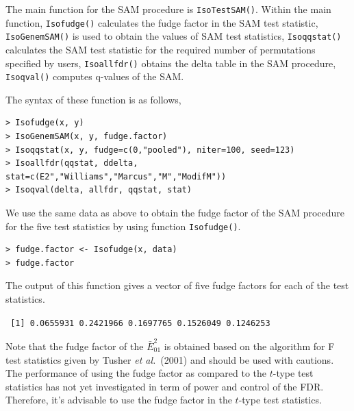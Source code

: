 The main function for the SAM procedure is \texttt{IsoTestSAM()}. Within the main function, \texttt{Isofudge()}
calculates the fudge factor in the SAM test statistic, \texttt{IsoGenemSAM()} is used
to obtain the values of SAM test statistics, \texttt{Isoqqstat()} calculates the SAM test statistic 
for the required number of permutations specified by users, \texttt{Isoallfdr()} obtains the delta table in the SAM procedure,
\texttt{Isoqval()} computes q-values of the SAM.  %

The syntax of these function is as follows,
\begin{center}
\begin{boxit}
\begin{verbatim}
> Isofudge(x, y)
> IsoGenemSAM(x, y, fudge.factor)
> Isoqqstat(x, y, fudge=c(0,"pooled"), niter=100, seed=123)
> Isoallfdr(qqstat, ddelta, stat=c(E2","Williams","Marcus","M","ModifM"))
> Isoqval(delta, allfdr, qqstat, stat)
\end{verbatim}
\end{boxit}
\end{center}


We use the same data as above to obtain the fudge factor of the SAM procedure for 
the five test statistics by using function \texttt{Isofudge()}.
\begin{center}
\begin{boxit}
\begin{verbatim}
> fudge.factor <- Isofudge(x, data)
> fudge.factor
\end{verbatim}
\end{boxit}
\end{center}

The output of this function gives a vector of five fudge factors for each of the test statistics. 
\begin{center}
\begin{boxit}
\texttt{
[1] 0.0655931 0.2421966 0.1697765 0.1526049 0.1246253
}
\end{boxit}
\end{center}
Note that the fudge factor of the $\bar{E}_{01}^2$ is obtained based on the algorithm for F test
statistics given by Tusher \textit{et al.}\ (2001) and should be used with cautions. The performance of using
the fudge factor as compared to the $t$-type test statistics has not yet investigated in term of 
power and control of the FDR. Therefore, it's advisable to use the fudge factor in the $t$-type test statistics. 

